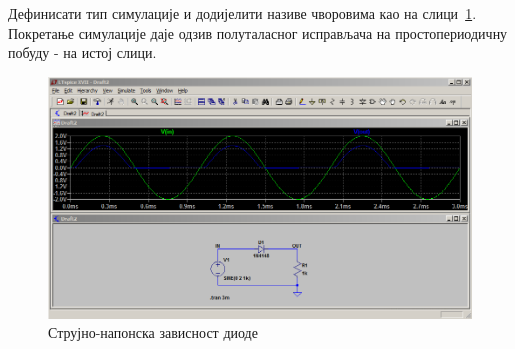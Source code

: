 Дефинисати тип симулације и додијелити називе чворовима као на слици~\ref{Fig:hwr-tran2}. Покретање симулације даје одзив полуталасног исправљача на простопериодичну побуду - на истој слици.

\begin{figure}[h]
\centering
\includegraphics[width=\figwidth\textwidth]{figs/hwr-tran2.PNG}
\caption{Струјно-напонска зависност диоде}
\label{Fig:hwr-tran2}
\end{figure}



\section*{}


